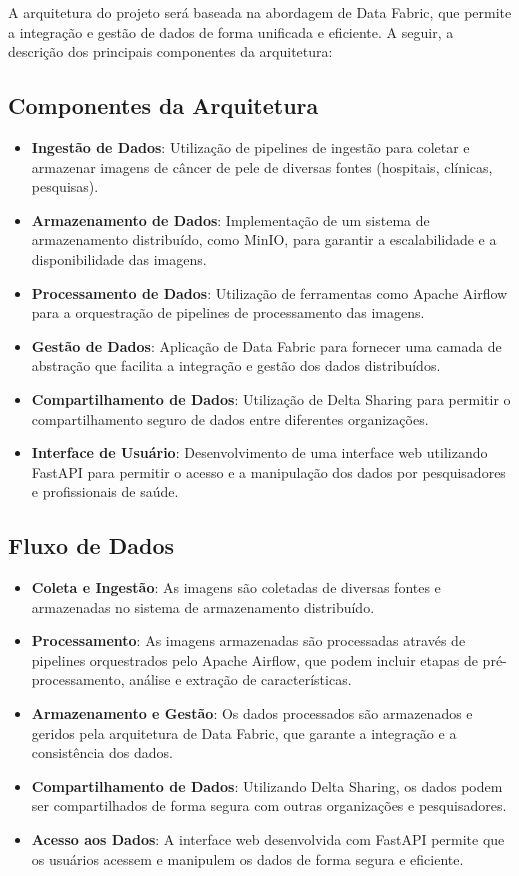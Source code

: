 A arquitetura do projeto será baseada na abordagem de Data Fabric, que permite a integração e gestão de dados de forma unificada e eficiente. A seguir, a descrição dos principais componentes da arquitetura:

\subsection{Componentes da Arquitetura}
\begin{itemize}
    \item \textbf{Ingestão de Dados}: Utilização de pipelines de ingestão para coletar e armazenar imagens de câncer de pele de diversas fontes (hospitais, clínicas, pesquisas).
    \item \textbf{Armazenamento de Dados}: Implementação de um sistema de armazenamento distribuído, como MinIO, para garantir a escalabilidade e a disponibilidade das imagens.
    \item \textbf{Processamento de Dados}: Utilização de ferramentas como Apache Airflow para a orquestração de pipelines de processamento das imagens.
    \item \textbf{Gestão de Dados}: Aplicação de Data Fabric para fornecer uma camada de abstração que facilita a integração e gestão dos dados distribuídos.
    \item \textbf{Compartilhamento de Dados}: Utilização de Delta Sharing para permitir o compartilhamento seguro de dados entre diferentes organizações.
    \item \textbf{Interface de Usuário}: Desenvolvimento de uma interface web utilizando FastAPI para permitir o acesso e a manipulação dos dados por pesquisadores e profissionais de saúde.
\end{itemize}

\subsection{Fluxo de Dados}
\begin{itemize}
    \item \textbf{Coleta e Ingestão}: As imagens são coletadas de diversas fontes e armazenadas no sistema de armazenamento distribuído.
    \item \textbf{Processamento}: As imagens armazenadas são processadas através de pipelines orquestrados pelo Apache Airflow, que podem incluir etapas de pré-processamento, análise e extração de características.
    \item \textbf{Armazenamento e Gestão}: Os dados processados são armazenados e geridos pela arquitetura de Data Fabric, que garante a integração e a consistência dos dados.
    \item \textbf{Compartilhamento de Dados}: Utilizando Delta Sharing, os dados podem ser compartilhados de forma segura com outras organizações e pesquisadores.
    \item \textbf{Acesso aos Dados}: A interface web desenvolvida com FastAPI permite que os usuários acessem e manipulem os dados de forma segura e eficiente.
\end{itemize}

